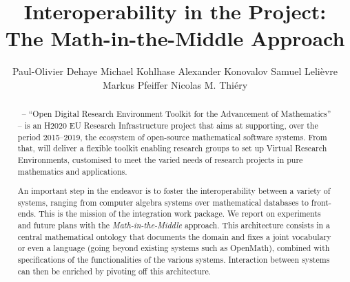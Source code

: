 \documentclass{llncs}
\title{Interoperability in the \ODK Project:\\
The Math-in-the-Middle Approach}
\author{Paul-Olivier Dehaye\inst{1} Michael Kohlhase\inst{2} Alexander
  Konovalov\inst{3} Samuel Lelièvre\inst{4} Markus
  Pfeiffer\inst{3} Nicolas M. Thiéry\inst{4}}
\institute{
  University of Z\"urich \and 
  Jacobs University \and 
  University of St~Andrews \and
  Universit\'e Paris-Sud
}
\begin{document}
\maketitle
\begin{abstract}
  \ODK\, -- ``Open Digital Research Environment Toolkit for the Advancement of
  Mathematics'' -- is an H2020 EU Research Infrastructure project that aims at
  supporting, over the period 2015--2019, the ecosystem of open-source mathematical
  software systems. From that, \ODK will deliver a flexible toolkit enabling research
  groups to set up Virtual Research Environments, customised to meet the varied needs of
  research projects in pure mathematics and applications.

  An important step in the \ODK endeavor is to foster the interoperability between a
  variety of systems, ranging from computer algebra systems over mathematical databases to
  front-ends. This is the mission of the integration work package. We report on
  experiments and future plans with the \emph{Math-in-the-Middle} approach. This architecture consists in a central mathematical ontology that documents the
  domain and fixes a joint vocabulary or even a language (going beyond existing systems such as OpenMath), combined with specifications of the functionalities
  of the various systems. Interaction between systems can then be enriched by pivoting off this architecture.
\end{abstract}








\printbibliography
\end{document}
